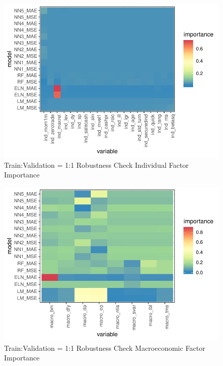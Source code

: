 \documentclass{article}
\begin{document}



\FloatBarrier


\begin{figure}
	\includegraphics[]{../../Results/empirical_train_valid_1/empirical_all_sample_vi_ind.pdf}
	\caption{{Train:Validation = 1:1 Robustness Check Individual Factor Importance}}
\end{figure}

\begin{figure}
	\includegraphics[]{../../Results/empirical_train_valid_1/empirical_sample_all_vi_macro.pdf}
	\caption{{Train:Validation = 1:1 Robustness Check Macroeconomic Factor Importance}}
\end{figure}
\end{document}
